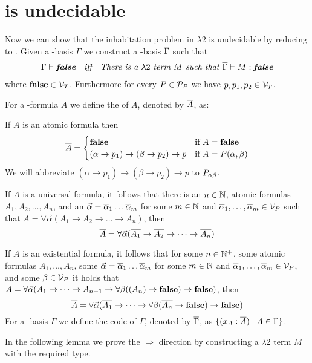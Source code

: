 \section{\lambdaInhab{} is undecidable}\label{sec.4}
Now we can show that the inhabitation problem in $\lambda2$ %
is undecidable by reducing \PCons{} to \lambdaInhab{}. Given a \SysP-basis $\Gamma$ we construct a \lambdaTwo-basis $\overline{\Gamma}$ such that 
\begin{align*}
\textit{$\Gamma\vdash\textbf{false}$}&&\textit{iff}&&\textit{There is a $\lambda2$ term $M$ such that  $\overline{\Gamma}\vdash M:\textbf{false}$}
\end{align*}
where $\textbf{false}\in\mathcal{V}_T$. Furthermore for every $P\in\mathcal{P}_P$ we have $p,p_1,p_2\in\mathcal{V}_T$. 

\begin{definition}\label{def.4.1}
For a \SysP-formula $A$ we define the  of $A$, denoted by $\overline{A}$, as:

If $A$ is an atomic formula then
\[
\trans{A}=
\begin{cases}
\false &\text{if $A=\false$}\\
(\alpha\to p_1)\to(\beta\to p_2)\to p &\text{if $A=P(\alpha,\beta)$} %
\end{cases}
\]
We will abbreviate $(\alpha\to p_1)\to(\beta\to p_2)\to p$ to $P_{\alpha\beta}$.

If $A$ is a universal formula, it follows that there is an $n\in\mathbb{N}$, atomic formulas $A_1,A_2,\dots,A_n$, and an $\predVec=\predVec[1]\dots\predVec[m]$ for some $m\in\mathbb{N}$ and $\predVec[1],\dots,\predVec[m]\in\VarP$ such that $A=\forall\vec{\alpha}(A_1\to A_2 \to\dots\to A_n)$, then 
\[\trans{A}=\forall\predVec(\trans{A_1}\to \trans{A_2} \to\dots\to\trans{ A_n})\]

If $A$ is an existential formula, it follows that for some $n\in\mathbb{N}^+$, some atomic formulas $A_1,\dots,A_n$, some $\predVec=\predVec[1]\dots\predVec[m]$ for some $m\in\mathbb{N}$ and $\predVec[1],\dots,\predVec[m]\in\VarP$, and some $\beta\in\mathcal{V}_P$ it holds that $A=\forall\vec{\alpha}(A_1 \to\dots\to A_{n-1}\to \forall\beta((A_n)\to\textbf{false})\to\textbf{false})$, then
\[\trans{A}=\forall\predVec(\trans{A_1}\to\dots\to\forall\beta(\trans{ A_n}\to\false)\to\false)\]
For a \SysP-basis $\Gamma$ we define the code of $\Gamma$, denoted by $\overline{\Gamma}$, as $\{(x_A:\overline{A})\mid A\in\Gamma\}$.
\end{definition}

In the following lemma we prove the $\Rightarrow$ direction by constructing a $\lambda2$ term $M$ with the required type.

